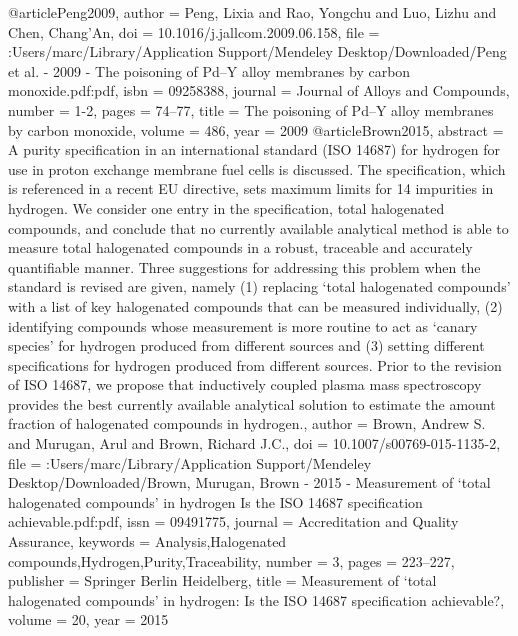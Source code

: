 @article{Peng2009,
author = {Peng, Lixia and Rao, Yongchu and Luo, Lizhu and Chen, Chang'An},
doi = {10.1016/j.jallcom.2009.06.158},
file = {:Users/marc/Library/Application Support/Mendeley Desktop/Downloaded/Peng et al. - 2009 - The poisoning of Pd–Y alloy membranes by carbon monoxide.pdf:pdf},
isbn = {09258388},
journal = {Journal of Alloys and Compounds},
number = {1-2},
pages = {74--77},
title = {{The poisoning of Pd–Y alloy membranes by carbon monoxide}},
volume = {486},
year = {2009}
}
@article{Brown2015,
abstract = {A purity specification in an international standard (ISO 14687) for hydrogen for use in proton exchange membrane fuel cells is discussed. The specification, which is referenced in a recent EU directive, sets maximum limits for 14 impurities in hydrogen. We consider one entry in the specification, total halogenated compounds, and conclude that no currently available analytical method is able to measure total halogenated compounds in a robust, traceable and accurately quantifiable manner. Three suggestions for addressing this problem when the standard is revised are given, namely (1) replacing `total halogenated compounds' with a list of key halogenated compounds that can be measured individually, (2) identifying compounds whose measurement is more routine to act as `canary species' for hydrogen produced from different sources and (3) setting different specifications for hydrogen produced from different sources. Prior to the revision of ISO 14687, we propose that inductively coupled plasma mass spectroscopy provides the best currently available analytical solution to estimate the amount fraction of halogenated compounds in hydrogen.},
author = {Brown, Andrew S. and Murugan, Arul and Brown, Richard J.C.},
doi = {10.1007/s00769-015-1135-2},
file = {:Users/marc/Library/Application Support/Mendeley Desktop/Downloaded/Brown, Murugan, Brown - 2015 - Measurement of ‘total halogenated compounds' in hydrogen Is the ISO 14687 specification achievable.pdf:pdf},
issn = {09491775},
journal = {Accreditation and Quality Assurance},
keywords = {Analysis,Halogenated compounds,Hydrogen,Purity,Traceability},
number = {3},
pages = {223--227},
publisher = {Springer Berlin Heidelberg},
title = {{Measurement of ‘total halogenated compounds' in hydrogen: Is the ISO 14687 specification achievable?}},
volume = {20},
year = {2015}
}
